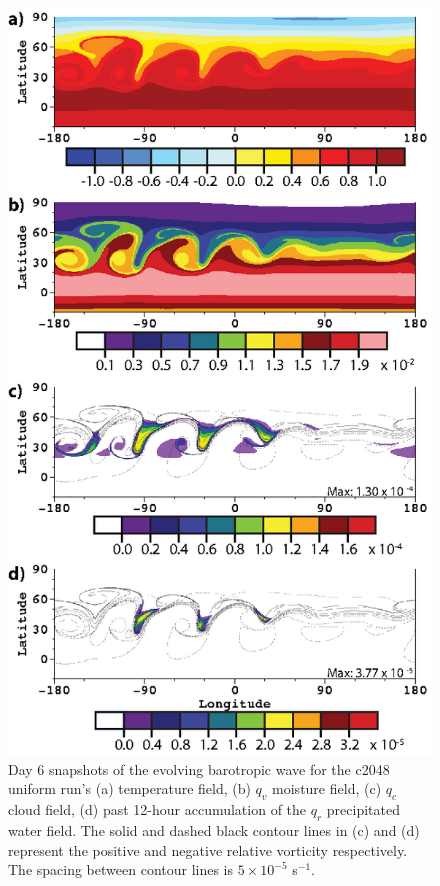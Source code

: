 \documentclass{ametsoc}
\begin{document}
\begin{figure}
   \centerline{%
   \noindent
   \includegraphics[height=.9\textheight]{Figures/A_c2048_allvar-01}}
   \caption{Day 6 snapshots of the evolving barotropic wave for the c2048 uniform 
   run's (a) temperature field, (b) $q_v$ moisture field, (c) $q_c$ cloud field, (d) past 12-hour 
   accumulation of the $q_r$ precipitated water field. The solid and dashed black contour
   lines in (c) and (d) represent the positive and negative relative vorticity respectively.
   The spacing between contour lines is $5 \times 10^{-5}$ s$^{-1}$.
   }
   \label{fig:c2048allvar}
\end{figure}
\end{document}
